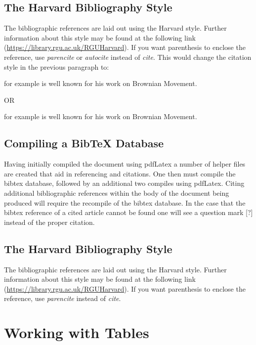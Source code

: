 \subsection{The Harvard Bibliography Style}

The bibliographic references are laid out using the Harvard style. Further information about this style may be found at the following link (\url{https://library.rgu.ac.uk/RGUHarvard}). If you want parenthesis to enclose the reference, use \textit{parencite} or \textit{autocite} instead of \textit{cite}. This would change the citation style in the previous paragraph to:

\parencite{book:einsteinBrownianMovement} for example is well known for his work on Brownian Movement.

OR

\autocite{book:einsteinBrownianMovement} for example is well known for his work on Brownian Movement.

\subsection{Compiling a BibTeX Database}

Having initially compiled the document using pdfLatex a number of helper files are created that aid in referencing and citations. One then must compile the bibtex database, followed by an additional two compiles using pdfLatex. Citing additional bibliographic references within the body of the document being produced will require the recompile of the bibtex database. In the case that the bibtex reference of a cited article cannot be found one will see a question mark [?] instead of the proper citation.

\subsection{The Harvard Bibliography Style}

The bibliographic references are laid out using the Harvard style. Further information about this style may be found at the following link (\url{https://library.rgu.ac.uk/RGUHarvard}). If you want parenthesis to enclose the reference, use \textit{parencite} instead of \textit{cite}.


\section{Working with Tables}

